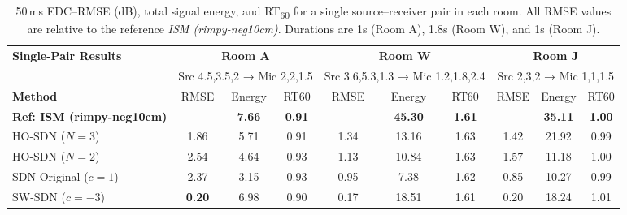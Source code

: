 \documentclass[journal]{IEEEtran}
\begin{document}

\begin{table}[!tb]
    \centering
    \caption{50\,ms EDC–RMSE (dB), total signal energy, and RT\textsubscript{60} for a single source–receiver pair in each room.  
             All RMSE values are relative to the reference \textit{ISM (rimpy-neg10cm)}.  
             Durations are 1s (Room A), 1.8s (Room W), and 1s (Room J).}
    \label{tab:single-pair-results}
    \renewcommand{\arraystretch}{1.15}
    \begin{tabular}{lccc|ccc|ccc}
        \toprule
        \textbf{Single-Pair Results} &
        \multicolumn{3}{c|}{\textbf{Room A}} &
        \multicolumn{3}{c|}{\textbf{Room W}} &
        \multicolumn{3}{c}{\textbf{Room J}} \\
        & \multicolumn{3}{c|}{\scriptsize Src 4.5,3.5,2 → Mic 2,2,1.5} &
          \multicolumn{3}{c|}{\scriptsize Src 3.6,5.3,1.3 → Mic 1.2,1.8,2.4} &
          \multicolumn{3}{c}{\scriptsize Src 2,3,2 → Mic 1,1,1.5} \\
        \textbf{Method} & RMSE & Energy & RT60 & RMSE & Energy & RT60 & RMSE & Energy & RT60 \\
        \midrule
        \textbf{Ref: ISM (rimpy-neg10cm)} & -- & \textbf{7.66} & \textbf{0.91} & -- & \textbf{45.30} & \textbf{1.61} & -- & \textbf{35.11} & \textbf{1.00} \\
        \midrule
        HO-SDN ($N=3$)      & 1.86 &  5.71 & 0.91 & 1.34 & 13.16 & 1.63 & 1.42 & 21.92 & 0.99 \\
        HO-SDN ($N=2$)      & 2.54 &  4.64 & 0.93 & 1.13 & 10.84 & 1.63 & 1.57 & 11.18 & 1.00 \\
        SDN Original ($c=1$)& 2.37 &  3.15 & 0.93 & 0.95 &  7.38 & 1.62 & 0.85 & 10.27 & 0.99 \\
        \midrule
        SW-SDN ($c=-3$)     & \textbf{0.20} &  6.98 & 0.90 & 0.17 & 18.51 & 1.61 & 0.20 & 18.24 & 1.01 \\

\end{tabular}
\end{table}
\end{document}
